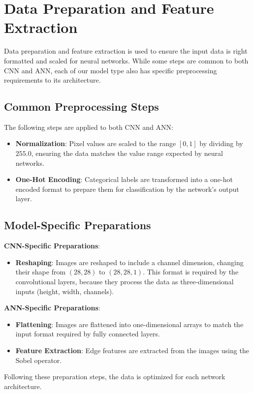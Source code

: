 \section{Data Preparation and Feature Extraction}

Data preparation and feature extraction is used to ensure the input data is right formatted and scaled for neural networks. While some steps are common to both CNN and ANN, each of our model type also has specific preprocessing requirements to its architecture.

\subsection{Common Preprocessing Steps}
The following steps are applied to both CNN and ANN:
\begin{itemize}
\item \textbf{Normalization}: Pixel values are scaled to the range $[0, 1]$ by dividing by $255.0$, ensuring the data matches the value range expected by neural networks.
\item \textbf{One-Hot Encoding}: Categorical labels are transformed into a one-hot encoded format to prepare them for classification by the network's output layer.
\end{itemize}

\subsection{Model-Specific Preparations}
\textbf{CNN-Specific Preparations}:
\begin{itemize}
\item \textbf{Reshaping}: Images are reshaped to include a channel dimension, changing their shape from $(28, 28)$ to $(28, 28, 1)$. This format is required by the convolutional layers, because they process the data as three-dimensional inputs (height, width, channels).
\end{itemize}

\textbf{ANN-Specific Preparations}:
\begin{itemize}
\item \textbf{Flattening}: Images are flattened into one-dimensional arrays to match the input format required by fully connected layers.
\item \textbf{Feature Extraction}: Edge features are extracted from the images using the Sobel operator.
\end{itemize}

Following these preparation steps, the data is optimized for each network architecture.